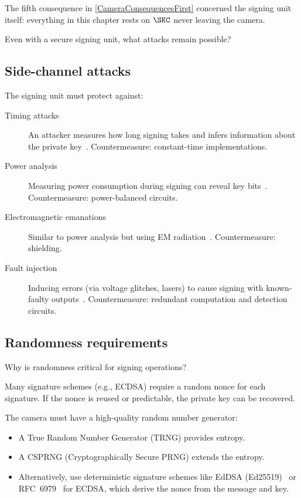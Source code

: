 The fifth consequence in \cref{CameraConsequencesFirst} concerned the
signing unit itself: everything in this chapter rests on \(\SKC\) never
leaving the camera.

\begin{exercise}
  Even with a secure signing unit, what attacks remain possible?
\end{exercise}

\subsection{Side-channel attacks}

The signing unit must protect against:
\begin{description}
  \item[Timing attacks] An attacker measures how long signing takes and
    infers information about the private key~\autocite{Kocher1996timing}.
    Countermeasure: constant-time implementations.
  \item[Power analysis] Measuring power consumption during signing can
    reveal key bits~\autocite{KocherJaffeJun1999dpa}.
    Countermeasure: power-balanced circuits.
  \item[Electromagnetic emanations] Similar to power analysis but using
    EM radiation~\autocite{QuisquaterSamyde2001ema}.
    Countermeasure: shielding.
  \item[Fault injection] Inducing errors (via voltage glitches, lasers)
    to cause signing with known-faulty outputs~\autocite{BDL1997fault}.
    Countermeasure: redundant computation and detection circuits.
\end{description}

\subsection{Randomness requirements}

\begin{exercise}
  Why is randomness critical for signing operations?
\end{exercise}

Many signature schemes (e.g., ECDSA) require a random nonce for each
signature.
If the nonce is reused or predictable, the private key can be recovered.

The camera must have a high-quality random number generator:
\begin{itemize}
  \item A True Random Number Generator (TRNG) provides entropy.
  \item A CSPRNG (Cryptographically Secure PRNG) extends the entropy.
  \item Alternatively, use deterministic signature schemes like EdDSA
    (Ed25519)~\autocite{Ed25519} or RFC~6979~\autocite{RFC6979} for
    ECDSA, which derive the nonce from the message and key.
\end{itemize}

